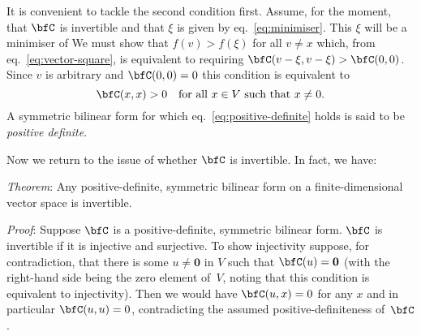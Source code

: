 \documentclass[10pt, a4paper]{article}
\begin{document}
It is convenient to tackle the second condition first. Assume, for the
moment, that $\bfC$ is invertible and that $\xi$ is given by
eq.~\eqref{eq:minimiser}. This $\xi$ will be a minimiser of We must show that $f(v)>f(\xi)$ for all
$v\neq x$ which, from eq.~\eqref{eq:vector-square}, is equivalent to
requiring $\bfC(v-\xi,v-\xi)>\bfC(0,0)$. Since $v$ is arbitrary and
$\bfC(0,0)=0$ this condition is equivalent to
\begin{equation}
  \label{eq:positive-definite}
  \bfC(x,x) > 0 \quad\text{for all $x\in V$ such that $x\neq0$}.
\end{equation}
A symmetric bilinear form for which eq.~\eqref{eq:positive-definite}
holds is said to be \emph{positive definite}. 

Now we return to the issue of whether $\bfC$ is invertible. In fact,
we have:

\emph{Theorem}: Any positive-definite, symmetric bilinear form on a
finite-dimensional vector space is invertible.

\emph{Proof}: Suppose $\bfC$ is a positive-definite, symmetric
bilinear form. $\bfC$ is invertible if it is injective and
surjective. To show injectivity suppose, for contradiction, that there
is some $u\neq\bm{0}$ in $V$ such that $\bfC(u)=\bm{0}$ (with the
right-hand side being the zero element of~$V$, noting that this
condition is equivalent to injectivity). Then we would have
$\bfC(u, x) =0$ for any $x$ and in particular $\bfC(u,u)=0$,
contradicting the assumed positive-definiteness of~$\bfC$. 
\end{document}
